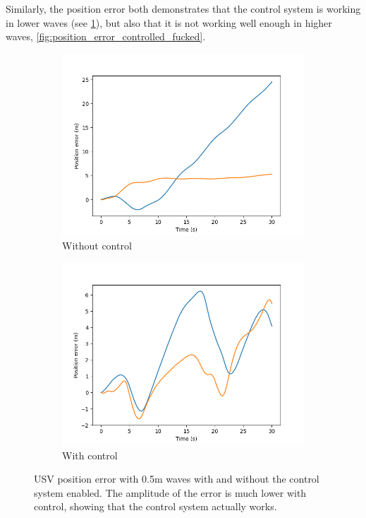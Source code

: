\documentclass[class=article, crop=false]{standalone}
\begin{document}
Similarly, the position error both demonstrates that the control system is working in lower waves (see \cref{fig:position_error_controlled}), but also that it is not working well enough in higher waves, \cref{fig:position_error_controlled_fucked}.

\begin{figure}
    \centering
    \begin{subfigure}{0.45\textwidth}
        \centering
        \includegraphics{scenario1/rov-50m/0.5m/usv_pos_error_uncontrolled}
        \caption{Without control}
    \end{subfigure}
    \hfill
    \begin{subfigure}{0.45\textwidth}
        \centering
        \includegraphics{scenario1/rov-50m/0.5m/usv_pos_error_controlled}
        \caption{With control}
    \end{subfigure}
    \caption{USV position error with 0.5m waves with and without the control system enabled. The amplitude of the error is much lower with control, showing that the control system actually works.}
    \label{fig:position_error_controlled}
\end{figure}
\end{document}
